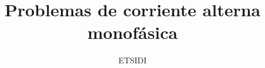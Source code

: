 \documentclass[a4paper,11pt]{article}
\title{Problemas de corriente alterna monofásica}
\date{}
\author{ETSIDI}
\begin{document}
\maketitle


\section{} 


\subsection{}


\newpage




\end{document}

